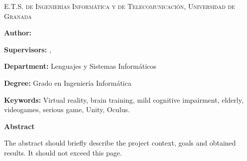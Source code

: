 
\pagestyle{fancy}

\begin{center}
	\scshape
	E.T.S. de Ingenierías Informática y de Telecomunicación, Universidad de Granada
\end{center}

\bigskip

\begin{center}
	\Large \scshape
	\textbf{\tfgtitlenameENG}
\end{center}

\bigskip \bigskip \bigskip

\begin{minipage}{\textwidth}

\textbf{Author:} \tfgauthorname

\medskip

\textbf{Supervisors:} \tfgtutornameA , \tfgtutornameB

\medskip


\medskip

\textbf{Department:} Lenguajes y Sistemas Informáticos

\medskip

\textbf{Degree:} Grado en Ingeniería Informática

\medskip

\textbf{Keywords:} Virtual reality, brain training, mild cognitive impairment, elderly, videogames, serious game, Unity, Oculus.

\bigskip \bigskip


\end{minipage}

\begin{center}
	\textbf{Abstract}
\end{center}

The abstract should briefly describe the project context, goals and
obtained results. It should not exceed this page.

\blankpage
